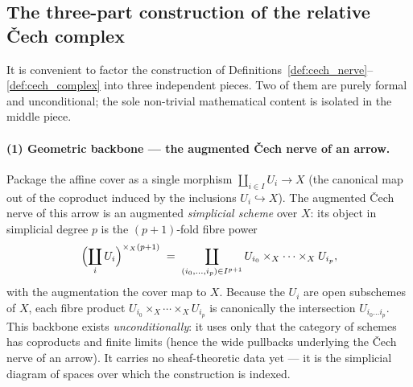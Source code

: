 \subsection{The three-part construction of the relative {\v C}ech complex}
\label{sec:cech_three_part}

It is convenient to factor the construction of
Definitions~\ref{def:cech_nerve}--\ref{def:cech_complex} into three independent
pieces. Two of them are purely formal and unconditional; the sole non-trivial
mathematical content is isolated in the middle piece.

\paragraph{(1) Geometric backbone — the augmented {\v C}ech nerve of an arrow.}
Package the affine cover as a single morphism
\(\coprod_{i \in I} U_i \longrightarrow X\) (the canonical map out of the
coproduct induced by the inclusions \(U_i \hookrightarrow X\)). The augmented
{\v C}ech nerve of this arrow is an augmented \emph{simplicial scheme} over
\(X\): its object in simplicial degree \(p\) is the \((p+1)\)-fold fibre power
\[
  \Bigl(\coprod_{i} U_i\Bigr)^{\times_X (p+1)}
    \;=\;
    \coprod_{(i_0, \ldots, i_p) \in I^{p+1}}
      U_{i_0} \times_X \cdots \times_X U_{i_p},
\]
with the augmentation the cover map to \(X\). Because the \(U_i\) are open
subschemes of \(X\), each fibre product \(U_{i_0} \times_X \cdots \times_X U_{i_p}\)
is canonically the intersection \(U_{i_0 \ldots i_p}\). This backbone exists
\emph{unconditionally}: it uses only that the category of schemes has coproducts
and finite limits (hence the wide pullbacks underlying the {\v C}ech nerve of an
arrow). It carries no sheaf-theoretic data yet — it is the simplicial diagram of
spaces over which the construction is indexed.

